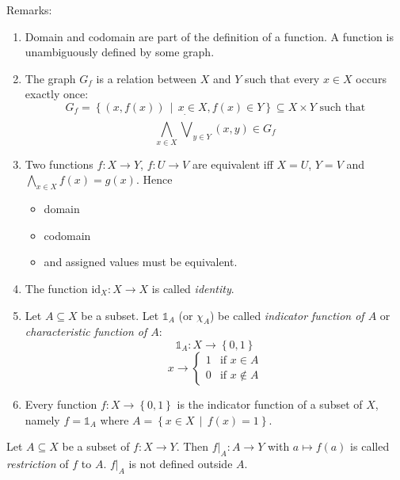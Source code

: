 \documentclass[a4paper,landscape,twocolumn]{article}
\newcommand\set[1]{\left\{#1\right\}}
\newcommand\setdef[2]{\left\{#1\,\middle|\,#2\right\}}
\begin{document}
Remarks:
\begin{enumerate}
  \item
    Domain and codomain are part of the definition of a function.
    A function is unambiguously defined by some graph.

  \item
    The graph $G_f$ is a relation between $X$ and $Y$ such
    that every $x \in X$ occurs exactly once:
    \[ G_f = \setdef{(x, f(x))}{x \in X, f(x) \in Y} \subseteq X \times Y \text{ such that} \]
    \[ \bigwedge_{x\in X} \dot\bigvee_{y\in Y} (x,y) \in G_f \]

  \item
    Two functions $f: X \rightarrow Y$, $f: U \rightarrow V$ are
    equivalent iff $X = U$, $Y = V$ and $\bigwedge_{x \in X} f(x) = g(x)$. Hence
    \begin{itemize}
      \item domain
      \item codomain
      \item and assigned values must be equivalent.
    \end{itemize}

  \item
    The function $\text{id}_X: X \rightarrow X$ is called \emph{identity}.

  \item
    Let $A \subseteq X$ be a subset. Let $\mathbb{1}_A$ (or $\chi_A$)
    be called \emph{indicator function of $A$} or
    \emph{characteristic function of $A$}:
    \[ \mathbb{1}_A: X \rightarrow \set{0,1} \]
    \[
       x \rightarrow \begin{cases}
         1 & \text{if } x \in A \\
         0 & \text{if } x \notin A
       \end{cases}
    \]

  \item
    Every function $f: X \rightarrow \set{0,1}$ is the indicator
    function of a subset of $X$, namely $f = \mathbb{1}_A$
    where $A = \setdef{x \in X}{f(x) = 1}$.
\end{enumerate}

Let $A \subseteq X$ be a subset of $f: X \rightarrow Y$.
Then $f|_A: A \rightarrow Y$ with $a \mapsto f(a)$ is
called \emph{restriction} of $f$ to $A$.
$f|_A$ is not defined outside $A$.
\end{document}
